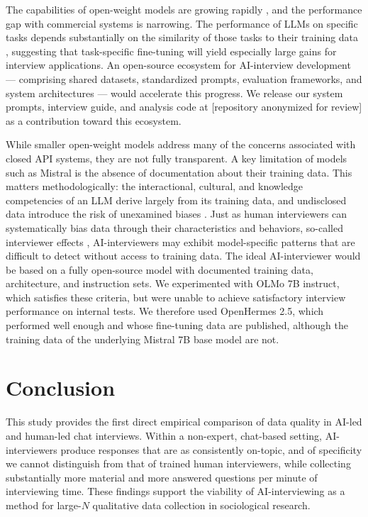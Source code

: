 \documentclass[12pt]{article}
\newcommand{\AII}{AI-interviewer}
\newcommand{\AIIs}{AI-interviewers}
\begin{document}
The capabilities of open-weight models are growing rapidly \citep{LuLiEtAl_2025_Small_Language_Models_Survey_Measurements_and_Insights}, and the performance gap with commercial systems is narrowing. The performance of LLMs on specific tasks depends substantially on the similarity of those tasks to their training data \citep{McCoyYaoEtAl_2024_Embers_of_autoregression_show_how_large_language_models_are_shaped_by_problem_they_are_trained_to_solve, McCoyYaoEtAl_2024_When_language_model_is_optimized_for_reasoning_does_it_still_show_embers_of_autoregression_analysis_of_OpenAI_o1}, suggesting that task-specific fine-tuning will yield especially large gains for interview applications. An open-source ecosystem for AI-interview development --- comprising shared datasets, standardized prompts, evaluation frameworks, and system architectures --- would accelerate this progress. We release our system prompts, interview guide, and analysis code at [repository anonymized for review] as a contribution toward this ecosystem.

While smaller open-weight models address many of the concerns associated with closed API systems, they are not fully transparent. A key limitation of models such as Mistral is the absence of documentation about their training data. This matters methodologically: the interactional, cultural, and knowledge competencies of an LLM derive largely from its training data, and undisclosed data introduce the risk of unexamined biases \citep{Navigli2023}. Just as human interviewers can systematically bias data through their characteristics and behaviors, so-called interviewer effects \citep{GrovesFultz1985, WestLi2019}, \AIIs{} may exhibit model-specific patterns that are difficult to detect without access to training data. The ideal \AII{} would be based on a fully open-source model with documented training data, architecture, and instruction sets. We experimented with OLMo 7B instruct, which satisfies these criteria, but were unable to achieve satisfactory interview performance on internal tests. We therefore used OpenHermes 2.5, which performed well enough and whose fine-tuning data are published, although the training data of the underlying Mistral 7B base model are not.


\section*{Conclusion}

This study provides the first direct empirical comparison of data quality in AI-led and human-led chat interviews. Within a non-expert, chat-based setting, \AIIs{} produce responses that are as consistently on-topic, and of specificity we cannot distinguish from that of trained human interviewers, while collecting substantially more material and more answered questions per minute of interviewing time. These findings support the viability of AI-interviewing as a method for large-$N$ qualitative data collection in sociological research.
\end{document}
